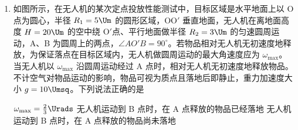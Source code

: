 \documentclass[\gkver]{gaokaozhenti}
\begin{document}
\begin{enumerate}

{乙波的波长为 $6 \Um$}
{$t = 6 \Us$ 时，M 向 $y$ 轴正方向运动}
{$t = 6 \Us$ 时，N 向 $y$ 轴负方向运动}


\item
如图所示，在无人机的某次定点投放性能测试中，目标区域是水平地面上以 O 点为圆心，半径 $R_{1} = 5 \Um$ 的圆形区域，OO$'$ 垂直地面，无人机在离地面高度 $H = 20 \Um$ 的空中绕 O$'$点、平行地面做半径 $R_{2} = 3 \Um$ 的匀速圆周运动，A、B 为圆周上的两点，$\angle AO'B = 90^{\circ}$。若物品相对无人机无初速度地释放，为保证落点在目标区域内，无人机做圆周运动的最大角速度应为 $\omega_{\max}$。当无人机以 $\omega_{\max}$ 沿圆周运动经过 A 点时，相对无人机无初速度地释放物品。不计空气对物品运动的影响，物品可视为质点且落地后即静止，重力加速度大小 $g = 10 \Umsq$。下列说法正确的是


{$\omega_{\max} = \frac{2}{3} \Urads$}
{无人机运动到 B 点时，在 A 点释放的物品已经落地}
{无人机运动到 B 点时，在 A 点释放的物品尚未落地}


\end{enumerate}
\end{document}
